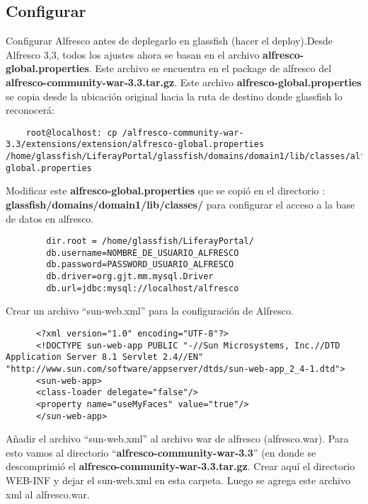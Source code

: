 \subsection{Configurar}

Configurar Alfresco antes de deplegarlo en glassfish (hacer el deploy).Desde Alfresco 3,3, todos los ajustes ahora se basan en el archivo \textbf{alfresco-global.properties}. Este archivo se encuentra en el package de alfresco del \textbf{alfresco-community-war-3.3.tar.gz}. Este archivo \textbf{alfresco-global.properties} se copia desde la ubicación original hacia la ruta de destino donde glassfish lo reconocerá:

    \lstset{language=sh,label=alfresco_config}
    \begin{lstlisting}
    root@localhost: cp /alfresco-community-war-3.3/extensions/extension/alfresco-global.properties /home/glassfish/LiferayPortal/glassfish/domains/domain1/lib/classes/alfresco-global.properties
    \end{lstlisting}

Modificar este\textbf{ alfresco-global.properties} que se copió en el directorio : \textbf{glassfish/domains/domain1/lib/classes/} para configurar el acceso a la base de datos en alfresco. 
    \lstset{language=sh,label=alfresco_config}
    \begin{lstlisting}
		dir.root = /home/glassfish/LiferayPortal/
		db.username=NOMBRE_DE_USUARIO_ALFRESCO
		db.password=PASSWORD_USUARIO_ALFRESCO
		db.driver=org.gjt.mm.mysql.Driver
		db.url=jdbc:mysql://localhost/alfresco
    \end{lstlisting}

Crear un archivo ``sun-web.xml'' para la configuración de Alfresco.\newline

    \lstset{language=xml,label=sun-web_XML}
    \begin{lstlisting}
      <?xml version="1.0" encoding="UTF-8"?>
      <!DOCTYPE sun-web-app PUBLIC "-//Sun Microsystems, Inc.//DTD Application Server 8.1 Servlet 2.4//EN" "http://www.sun.com/software/appserver/dtds/sun-web-app_2_4-1.dtd">
      <sun-web-app>
      <class-loader delegate="false"/>
      <property name="useMyFaces" value="true"/>
      </sun-web-app>
    \end{lstlisting}

Añadir el archivo ``sun-web.xml''  al archivo war de alfresco (alfresco.war). Para esto vamos al directorio ``\textbf{alfresco-community-war-3.3}'' (en donde se descomprimió el  \textbf{alfresco-community-war-3.3.tar.gz}. Crear aquí el directorio WEB-INF y dejar el sun-web.xml en esta carpeta. Luego se agrega este archivo xml al alfresco.war.\newline

